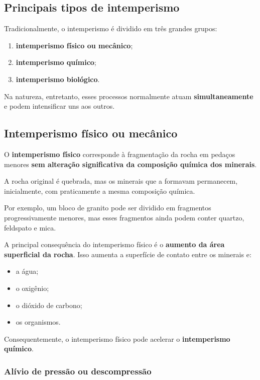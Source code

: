 \subsection{Principais tipos de intemperismo}

Tradicionalmente, o intemperismo é dividido em três grandes grupos:

\begin{enumerate}
    \item \textbf{intemperismo físico ou mecânico};
    \item \textbf{intemperismo químico};
    \item \textbf{intemperismo biológico}.
\end{enumerate}

Na natureza, entretanto, esses processos normalmente atuam \textbf{simultaneamente} e podem intensificar uns aos outros.

\subsection{Intemperismo físico ou mecânico}

O \textbf{intemperismo físico} corresponde à fragmentação da rocha em pedaços menores \textbf{sem alteração significativa da composição química dos minerais}.

A rocha original é quebrada, mas os minerais que a formavam permanecem, inicialmente, com praticamente a mesma composição química.

Por exemplo, um bloco de granito pode ser dividido em fragmentos progressivamente menores, mas esses fragmentos ainda podem conter quartzo, feldspato e mica.

A principal consequência do intemperismo físico é o \textbf{aumento da área superficial da rocha}. Isso aumenta a superfície de contato entre os minerais e:

\begin{itemize}
    \item a água;
    \item o oxigênio;
    \item o dióxido de carbono;
    \item os organismos.
\end{itemize}

Consequentemente, o intemperismo físico pode acelerar o \textbf{intemperismo químico}.

\subsubsection{Alívio de pressão ou descompressão}

